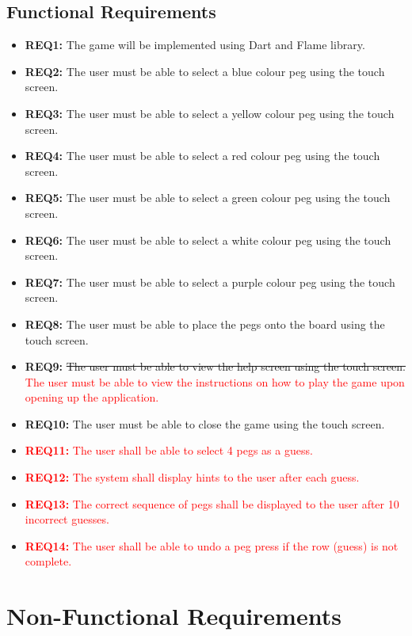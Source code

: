 \documentclass[12pt, titlepage]{article}
\begin{document}
\subsection{Functional Requirements}
\begin{itemize}
    \item \textbf{REQ1:} The game will be implemented using Dart and Flame library.
    \item \textbf{REQ2:} The user must be able to select  a blue colour peg using the touch screen.
    \item \textbf{REQ3:} The user must be able to select  a yellow colour peg using the touch screen.
    \item \textbf{REQ4:} The user must be able to select  a red colour peg using the touch screen.
    \item \textbf{REQ5:} The user must be able to select  a green colour peg using the touch screen.
    \item \textbf{REQ6:} The user must be able to select  a white colour peg using the touch screen.
    \item \textbf{REQ7:} The user must be able to select  a purple colour peg using the touch screen.
    \item \textbf{REQ8:} The user must be able to place the pegs onto the board using the touch screen.
    \item \textbf{REQ9:} \sout{The user must be able to view the help screen using the touch screen.}
    \textcolor{red}{The user must be able to view the instructions on how to play the game upon opening up the application.}
    \item \textbf{REQ10:} The user must be able to close the game using the touch screen.
    \item \textcolor{red}{\textbf{REQ11:} The user shall be able to select 4 pegs as a guess.}
    \item \textcolor{red}{\textbf{REQ12:} The system shall display hints to the user after each guess.}
    \item \textcolor{red}{\textbf{REQ13:} The correct sequence of pegs shall be displayed to the user after 10 incorrect guesses.}
    \item \textcolor{red}{\textbf{REQ14:} The user shall be able to undo a peg press if the row (guess) is not complete.}

\end{itemize}

\section{Non-Functional Requirements}
\end{document}

